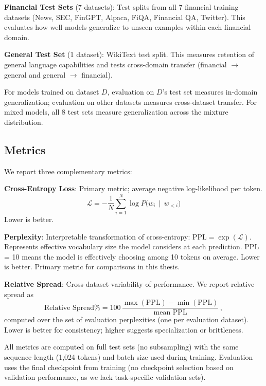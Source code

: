 \textbf{Financial Test Sets} (7 datasets): Test splits from all 7 financial training datasets (News, SEC, FinGPT, Alpaca, FiQA, Financial QA, Twitter). This evaluates how well models generalize to unseen examples within each financial domain.

\textbf{General Test Set} (1 dataset): WikiText test split. This measures retention of general language capabilities and tests cross-domain transfer (financial $\to$ general and general $\to$ financial).

For models trained on dataset $D$, evaluation on $D$'s test set measures in-domain generalization; evaluation on other datasets measures cross-dataset transfer. For mixed models, all 8 test sets measure generalization across the mixture distribution.

\subsection{Metrics}

We report three complementary metrics:

\textbf{Cross-Entropy Loss}: Primary metric; average negative log-likelihood per token.
\begin{equation*}
    \mathcal{L} = -\frac{1}{N}\sum_{i=1}^{N} \log P\bigl(w_i \,\mid\, w_{<i}\bigr)
\end{equation*}
Lower is better.

\textbf{Perplexity}: Interpretable transformation of cross-entropy: $\text{PPL} = \exp(\mathcal{L})$. Represents effective vocabulary size the model considers at each prediction. PPL = 10 means the model is effectively choosing among 10 tokens on average. Lower is better. Primary metric for comparisons in this thesis.

\textbf{Relative Spread}: Cross-dataset variability of performance. We report relative spread as
\begin{equation*}
    \text{Relative Spread}\% = 100\,\frac{\max(\text{PPL}) - \min(\text{PPL})}{\text{mean PPL}}\, ,
\end{equation*}
computed over the set of evaluation perplexities (one per evaluation dataset). Lower is better for consistency; higher suggests specialization or brittleness.

All metrics are computed on full test sets (no subsampling) with the same sequence length (1,024 tokens) and batch size used during training. Evaluation uses the final checkpoint from training (no checkpoint selection based on validation performance, as we lack task-specific validation sets).
